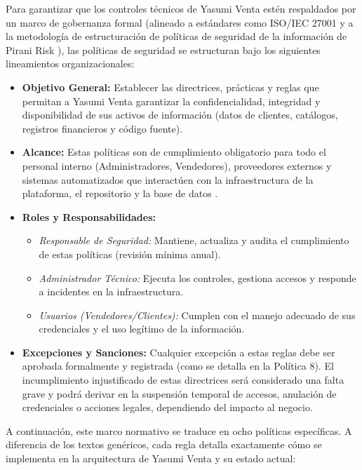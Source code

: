 \documentclass[12pt,letterpaper]{article}
\newcommand{\cod}[1]{\path{#1}}
\begin{document}
Para garantizar que los controles técnicos de Yasumi Venta estén respaldados por un marco de gobernanza formal (alineado a estándares como ISO/IEC 27001 \cite{iso27001} y a la metodología de estructuración de políticas de seguridad de la información de Pirani Risk \cite{pirani}), las políticas de seguridad se estructuran bajo los siguientes lineamientos organizacionales:

\begin{itemize}
    \item \textbf{Objetivo General:} Establecer las directrices, prácticas y reglas que permitan a Yasumi Venta garantizar la confidencialidad, integridad y disponibilidad de sus activos de información (datos de clientes, catálogos, registros financieros y código fuente).
    \item \textbf{Alcance:} Estas políticas son de cumplimiento obligatorio para todo el personal interno (Administradores, Vendedores), proveedores externos y sistemas automatizados que interactúen con la infraestructura de la plataforma, el repositorio \cod{MigXploit/Sistema-ventas} y la base de datos \cod{bd_yasumi}.
    \item \textbf{Roles y Responsabilidades:}
    \begin{itemize}
        \item \textit{Responsable de Seguridad:} Mantiene, actualiza y audita el cumplimiento de estas políticas (revisión mínima anual).
        \item \textit{Administrador Técnico:} Ejecuta los controles, gestiona accesos y responde a incidentes en la infraestructura.
        \item \textit{Usuarios (Vendedores/Clientes):} Cumplen con el manejo adecuado de sus credenciales y el uso legítimo de la información.
    \end{itemize}
    \item \textbf{Excepciones y Sanciones:} Cualquier excepción a estas reglas debe ser aprobada formalmente y registrada (como se detalla en la Política 8). El incumplimiento injustificado de estas directrices será considerado una falta grave y podrá derivar en la suspensión temporal de accesos, anulación de credenciales o acciones legales, dependiendo del impacto al negocio.
\end{itemize}

A continuación, este marco normativo se traduce en ocho políticas específicas. A diferencia de los textos genéricos, cada regla detalla exactamente cómo se implementa en la arquitectura de Yasumi Venta y su estado actual:
\pagebreak
\end{document}
